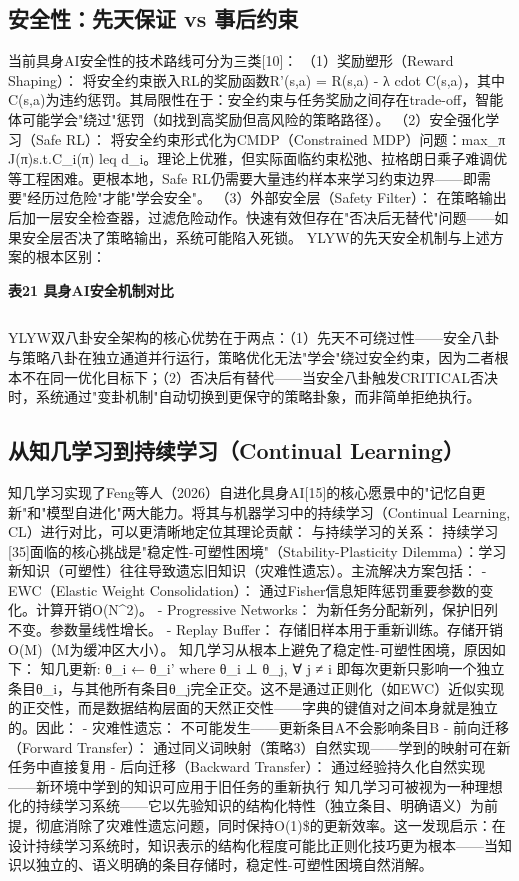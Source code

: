 \documentclass[12pt,a4paper]{article}
\begin{document}
\subsection{安全性：先天保证 vs 事后约束}
当前具身AI安全性的技术路线可分为三类[10]：
（1）奖励塑形（Reward Shaping）： 将安全约束嵌入RL的奖励函数R'(s,a) = R(s,a) - λ cdot C(s,a)，其中C(s,a)为违约惩罚。其局限性在于：安全约束与任务奖励之间存在trade-off，智能体可能学会"绕过"惩罚（如找到高奖励但高风险的策略路径）。
（2）安全强化学习（Safe RL）： 将安全约束形式化为CMDP（Constrained MDP）问题：max\_π J(π)s.t.C\_i(π) leq d\_i。理论上优雅，但实际面临约束松弛、拉格朗日乘子难调优等工程困难。更根本地，Safe RL仍需要大量违约样本来学习约束边界——即需要"经历过危险"才能"学会安全"。
（3）外部安全层（Safety Filter）： 在策略输出后加一层安全检查器，过滤危险动作。快速有效但存在"否决后无替代"问题——如果安全层否决了策略输出，系统可能陷入死锁。
YLYW的先天安全机制与上述方案的根本区别：

\begin{center}
\textbf{表21  具身AI安全机制对比}
\begin{tabular}{lcccc}
\hline
\end{tabular}
\end{center}
YLYW双八卦安全架构的核心优势在于两点：（1）先天不可绕过性——安全八卦与策略八卦在独立通道并行运行，策略优化无法"学会"绕过安全约束，因为二者根本不在同一优化目标下；（2）否决后有替代——当安全八卦触发CRITICAL否决时，系统通过"变卦机制"自动切换到更保守的策略卦象，而非简单拒绝执行。

\subsection{从知几学习到持续学习（Continual Learning）}
知几学习实现了Feng等人（2026）自进化具身AI[15]的核心愿景中的"记忆自更新"和"模型自进化"两大能力。将其与机器学习中的持续学习（Continual Learning, CL）进行对比，可以更清晰地定位其理论贡献：
与持续学习的关系：
持续学习[35]面临的核心挑战是"稳定性-可塑性困境"（Stability-Plasticity Dilemma）：学习新知识（可塑性）往往导致遗忘旧知识（灾难性遗忘）。主流解决方案包括：
- EWC（Elastic Weight Consolidation）： 通过Fisher信息矩阵惩罚重要参数的变化。计算开销O(N^2)。
- Progressive Networks： 为新任务分配新列，保护旧列不变。参数量线性增长。
- Replay Buffer： 存储旧样本用于重新训练。存储开销O(M)（M为缓冲区大小）。
知几学习从根本上避免了稳定性-可塑性困境，原因如下：
知几更新:  θ\_i ← θ\_i'    where    θ\_i ⊥ θ\_j, ∀ j ≠ i
即每次更新只影响一个独立条目θ\_i，与其他所有条目θ\_j完全正交。这不是通过正则化（如EWC）近似实现的正交性，而是数据结构层面的天然正交性——字典的键值对之间本身就是独立的。因此：
- 灾难性遗忘： 不可能发生——更新条目A不会影响条目B
- 前向迁移（Forward Transfer）： 通过同义词映射（策略3）自然实现——学到的映射可在新任务中直接复用
- 后向迁移（Backward Transfer）： 通过经验持久化自然实现——新环境中学到的知识可应用于旧任务的重新执行
知几学习可被视为一种理想化的持续学习系统——它以先验知识的结构化特性（独立条目、明确语义）为前提，彻底消除了灾难性遗忘问题，同时保持O(1)\$的更新效率。这一发现启示：在设计持续学习系统时，知识表示的结构化程度可能比正则化技巧更为根本——当知识以独立的、语义明确的条目存储时，稳定性-可塑性困境自然消解。
\end{document}
